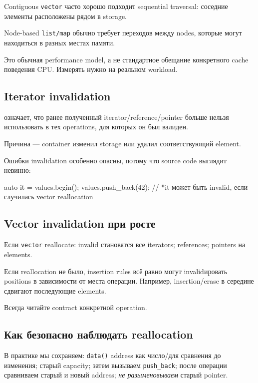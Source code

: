 Contiguous \texttt{vector} часто хорошо подходит sequential traversal:
соседние элементы расположены рядом в storage.

Node-based \texttt{list/map} обычно требует переходов между nodes, которые
могут находиться в разных местах памяти.

Это обычная performance model, а не стандартное обещание конкретного cache
поведения CPU. Измерять нужно на реальном workload.

\subsection{Iterator invalidation}

 означает, что ранее полученный iterator/reference/pointer
больше нельзя использовать в тех operations, для которых он был валиден.

Причина --- container изменил storage или удалил соответствующий element.

Ошибки invalidation особенно опасны, потому что source code выглядит невинно:

\begin{cppcode}
auto it = values.begin();
values.push_back(42);
// *it может быть invalid, если случилась vector reallocation
\end{cppcode}

\subsection{Vector invalidation при росте}

Если \texttt{vector} reallocate:
invalid становятся все iterators; references; pointers на elements.

Если reallocation не было, insertion rules всё равно могут invalidировать
positions в зависимости от места операции. Например, insertion/erase в
середине сдвигают последующие elements.

Всегда читайте contract конкретной operation.

\subsection{Как безопасно наблюдать reallocation}

В практике мы сохраняем:
\texttt{data()} address как число/для сравнения до изменения; старый capacity; затем вызываем \texttt{push\_back}; после операции сравниваем старый и новый address; \emph{не разыменовываем} старый pointer.

